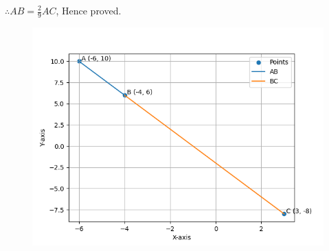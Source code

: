 \documentclass[journal,12pt,onecolumn]{IEEEtran}
\theoremstyle{remark}
\begin{document}
$\therefore AB = \frac{2}{9} AC$, Hence proved.

\begin{figure}[h!]
	\centering
	\includegraphics[width=0.7\linewidth]{figs/fig1.png}
\end{figure}
\end{document}
